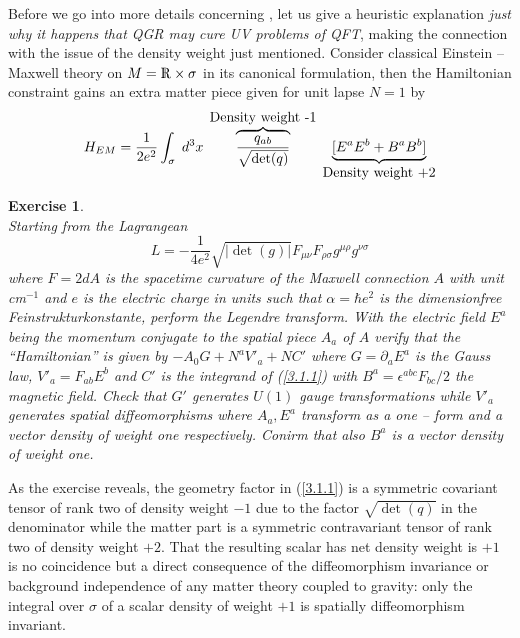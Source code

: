 \documentclass[12pt]{report}
\newtheorem{Exercise}{Exercise}[section]
\def\be{\begin{equation}}
\def\ee{\end{equation}}
\def\Rl{{\mathchoice
{\setbox0=\hbox{$\displaystyle\rm R$}\hbox{\hbox to0pt
{\kern0.4\wd0\vrule height0.9\ht0\hss}\box0}}
{\setbox0=\hbox{$\textstyle\rm R$}\hbox{\hbox to0pt
{\kern0.4\wd0\vrule height0.9\ht0\hss}\box0}}
{\setbox0=\hbox{$\scriptstyle\rm R$}\hbox{\hbox to0pt
{\kern0.4\wd0\vrule height0.9\ht0\hss}\box0}}
{\setbox0=\hbox{$\scriptscriptstyle\rm R$}\hbox{\hbox to0pt
{\kern0.4\wd0\vrule height0.9\ht0\hss}\box0}}}}
\def\blue{\relax}
\def\red{\relax}
\def\green{\relax}
\begin{document}
Before we go into more details concerning \cite{41}, let us give a 
heuristic explanation {\it just why it happens that QGR may cure UV 
problems 
of QFT}, making the connection with the issue of the density weight
just mentioned. Consider classical Einstein -- Maxwell theory on 
$M=\Rl\times \sigma$ in its 
canonical formulation, then the Hamiltonian constraint gains an extra
matter piece given for unit lapse $N=1$ by 
\be \label{3.1.1}
H_{EM}=\frac{1}{2 e^2}\int_\sigma\; d^3x \; 
\overbrace{{\blue \frac{q_{ab}}{\sqrt{\det(q)}}}}^{\mbox{{\red Density 
weight -1}}}\;
\underbrace{{\green [E^a E^b+B^a B^b]}}_{\mbox{{\red Density weight +2}}} 
\ee
%
\begin{Exercise} \label{ex3.1.1} ~~~~\\
Starting from the Lagrangean 
\be \label{ex3.1.1a}
L=-\frac{1}{4e^2}\sqrt{|\det(g)|}F_{\mu\nu} F_{\rho\sigma} g^{\mu\rho}
g^{\nu\sigma}
\ee
where $F=2dA$ is the spacetime curvature of the Maxwell connection $A$ 
with unit cm$^{-1}$ and  
$e$ is the electric charge in units such that $\alpha=\hbar e^2$ is the 
dimensionfree Feinstrukturkonstante, perform the Legendre transform.
With the electric field $E^a$ being the momentum conjugate to the spatial
piece $A_a$ of $A$ verify that the ``Hamiltonian'' is given by 
$-A_0 G+N^a V'_a+N C'$ where $G=\partial_a E^a$ is the Gauss law,
$V'_a=F_{ab} E^b$ and $C'$ is the integrand of (\ref{3.1.1}) with 
$B^a=\epsilon^{abc} F_{bc}/2$ the magnetic field. Check that $G'$
generates $U(1)$ gauge transformations while $V'_a$ generates 
spatial diffeomorphisms where $A_a,E^a$ transform as a one -- form 
and a vector density of weight one respectively. Conirm that also 
$B^a$ is a vector density of weight one.
\end{Exercise}
%
As the exercise reveals, the geometry factor in (\ref{3.1.1}) is a 
symmetric covariant tensor of rank two of density weight $-1$ due to the 
factor $\sqrt{\det(q)}$ in the denominator while the matter part is a
symmetric contravariant tensor of rank two of density weight $+2$.
That the resulting scalar has net density weight is $+1$ is no coincidence 
but a direct 
consequence of the diffeomorphism invariance or background independence of 
any matter theory coupled 
to gravity: only the integral over $\sigma$ of a scalar density of weight 
$+1$ is spatially diffeomorphism invariant.
\end{document}
